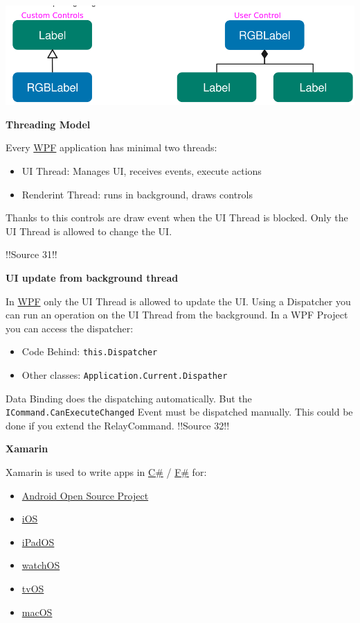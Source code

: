 \documentclass[10pt,twoside,landscape]{article}
\begin{document}
\begin{multicols}{3}
\begin{center}
\includegraphics[width=.9\linewidth]{img/custom_user_control.png}
\end{center}

\textbf{Threading Model}

Every \href{../../../roam/20211123162923-wpf.org}{WPF} application has minimal two threads:
\begin{itemize}
\item UI Thread: Manages UI, receives events, execute actions
\item Renderint Thread: runs in background, draws controls
\end{itemize}


Thanks to this controls are draw event when the UI Thread is blocked.
Only the UI Thread is allowed to change the UI.

!!Source 31!!

\textbf{UI update from background thread}

In \href{../../../roam/20211123162923-wpf.org}{WPF} only the UI Thread is allowed to update the UI.
Using a Dispatcher you can run an operation on the UI Thread from the background.
In a WPF Project you can access the dispatcher:
\begin{itemize}
\item Code Behind: \texttt{this.Dispatcher}
\item Other classes: \texttt{Application.Current.Dispather}
\end{itemize}


Data Binding does the dispatching automatically.
But the \texttt{ICommand.CanExecuteChanged} Event must be dispatched manually.
This could be done if you extend the RelayCommand.
!!Source 32!!

\textbf{Xamarin}

Xamarin is used to write apps in \href{../../../roam/20211003114158-c.org}{C\#} / \href{../../../roam/20211003114238-f.org}{F\#} for:
\begin{itemize}
\item \href{../../../roam/20210921143632-aosp.org}{Android Open Source Project}
\item \href{../../../roam/20220103094421-ios.org}{iOS}
\item \href{../../../roam/20220103094441-ipados.org}{iPadOS}
\item \href{../../../roam/20220103094458-watchos.org}{watchOS}
\item \href{../../../roam/20220103094511-tvos.org}{tvOS}
\item \href{../../../roam/20220103094529-macos.org}{macOS}
\end{itemize}



\end{multicols}
\end{document}
